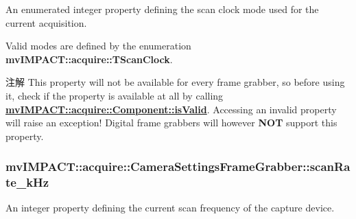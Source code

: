 An enumerated integer property defining the scan clock mode used for the current acquisition. 

Valid modes are defined by the enumeration {\bfseries mv\+I\+M\+P\+A\+C\+T\+::acquire\+::\+T\+Scan\+Clock}.

\begin{DoxyNote}{注解}
This property will not be available for every frame grabber, so before using it, check if the property is available at all by calling {\bfseries \hyperlink{classmv_i_m_p_a_c_t_1_1acquire_1_1_component_ac51e55e7e046101f3c6119d84123abd5}{mv\+I\+M\+P\+A\+C\+T\+::acquire\+::\+Component\+::is\+Valid}}. Accessing an invalid property will raise an exception! Digital frame grabbers will however {\bfseries N\+O\+T} support this property. 
\end{DoxyNote}
\hypertarget{classmv_i_m_p_a_c_t_1_1acquire_1_1_camera_settings_frame_grabber_ad902ed2dd56b7d24fd03f9b27449dcf8}{
\subsubsection[{scan\+Rate\+\_\+k\+Hz}]{ mv\+I\+M\+P\+A\+C\+T\+::acquire\+::\+Camera\+Settings\+Frame\+Grabber\+::scan\+Rate\+\_\+k\+Hz}}\label{classmv_i_m_p_a_c_t_1_1acquire_1_1_camera_settings_frame_grabber_ad902ed2dd56b7d24fd03f9b27449dcf8}


An integer property defining the current scan frequency of the capture device. 

